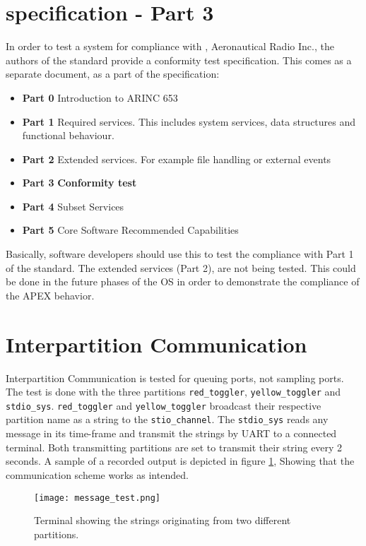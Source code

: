 \section{\arinc{} specification - Part 3}
In order to test a system for compliance with \arinc{}, Aeronautical
Radio Inc., the authors of the standard provide a conformity test
specification. This comes as a separate document, as a part of the
\arinc{} specification:
\begin{itemize}
	\item\textbf{Part 0} Introduction to ARINC 653
	\item\textbf{Part 1} Required services. This includes system services,
	data structures and functional behaviour.
	\item\textbf{Part 2} Extended services. For example file handling or external events
	\item\textbf{Part 3} \textbf{Conformity test}
	\item\textbf{Part 4} Subset Services
	\item\textbf{Part 5} Core Software Recommended Capabilities
\end{itemize}

Basically, software developers should use this to test the compliance with
Part 1 of the standard. The extended services (Part 2), are not being
tested. This could be done in the future phases of the \OSname{} OS in order
to demonstrate the compliance of the APEX behavior. 

\section{Interpartition Communication}
Interpartition Communication is tested for queuing ports, not sampling ports.
The test is done with the three partitions \texttt{red\_toggler},
\texttt{yellow\_toggler} and \texttt{stdio\_sys}. \texttt{red\_toggler} and
\texttt{yellow\_toggler} broadcast their respective partition name as a string
to the \texttt{stio\_channel}. The \texttt{stdio\_sys} reads any message in its
time-frame and transmit the strings by UART to a connected terminal. Both
transmitting partitions are set to transmit their string every 2 seconds. A
sample of a recorded output is depicted in figure \ref{fig:message_test},
Showing that the communication scheme works as intended.

\begin{figure}[H]
	\centering
	\texttt{[image: message\_test.png]}
	\caption{Terminal showing the strings originating from two different
		partitions.}
	\label{fig:message_test}
\end{figure}

